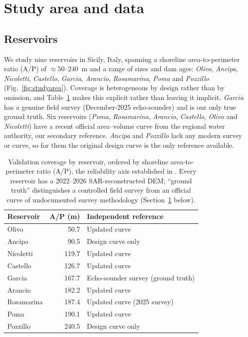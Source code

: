 \section{Study area and data}
\label{sec:data}

\subsection{Reservoirs}
We study nine reservoirs in Sicily, Italy, spanning a shoreline area-to-perimeter
ratio (A/P) of ${\approx}50$--$240$~m and a range of sizes and dam ages: \emph{Olivo},
\emph{Ancipa}, \emph{Nicoletti}, \emph{Castello}, \emph{Garcia}, \emph{Arancio},
\emph{Rosamarina}, \emph{Poma} and \emph{Pozzillo} (Fig.~\ref{fig:studyarea}). Coverage
is heterogeneous by design rather than by omission, and Table~\ref{tab:coverage} makes
this explicit rather than leaving it implicit. \emph{Garcia} has a genuine field survey
(December-2025 echo-sounder) and is our only true ground truth. Six reservoirs
(\emph{Poma}, \emph{Rosamarina}, \emph{Arancio}, \emph{Castello}, \emph{Olivo} and
\emph{Nicoletti}) have a recent official area--volume curve from the regional water
authority, our secondary reference. \emph{Ancipa} and \emph{Pozzillo} lack any modern
survey or curve, so for them the original design curve is the only reference available.

\begin{table}[htbp]\centering\small
\caption{Validation coverage by reservoir, ordered by shoreline area-to-perimeter
ratio (A/P), the reliability axis established in \citet{PaperOne}. Every reservoir
has a 2022--2026 SAR-reconstructed DEM; ``ground truth'' distinguishes a controlled
field survey from an official curve of undocumented survey methodology
(Section~\ref{sec:data} below).}
\label{tab:coverage}
\begin{tabular}{lrl}
\toprule
Reservoir & A/P (m) & Independent reference \\
\midrule
Olivo       &  50.7 & Updated curve \\
Ancipa      &  90.5 & Design curve only \\
Nicoletti   & 119.7 & Updated curve \\
Castello    & 126.7 & Updated curve \\
Garcia      & 167.7 & Echo-sounder survey (ground truth) \\
Arancio     & 182.2 & Updated curve \\
Rosamarina  & 187.4 & Updated curve (2025 survey) \\
Poma        & 190.1 & Updated curve \\
Pozzillo    & 240.5 & Design curve only \\
\bottomrule
\end{tabular}
\end{table}

